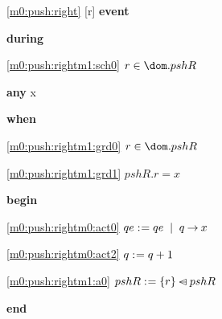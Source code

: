 \noindent \ref{m0:push:right} [r] \textbf{event}
\begin{block}
  \item   \textbf{during}
  \begin{block}
  \item[ \eqref{m0:push:rightm1:sch0} ]$r \in \dom.pshR $ %
  \end{block}
  \item   \textbf{any} x
  \item   \textbf{when}
  \begin{block}
  \item[ \eqref{m0:push:rightm1:grd0} ]$r \in \dom.pshR $ %
  \item[ \eqref{m0:push:rightm1:grd1} ]$pshR.r = x $ %
  \end{block}
  \item   \textbf{begin}
  \begin{block}
  \item[ \eqref{m0:push:rightm0:act0} ]$qe \mathrel{:\mkern1mu=} qe \; \; | \; \; q \mathbin\rightarrow x $ %
  \item[ \eqref{m0:push:rightm0:act2} ]$q \mathrel{:\mkern1mu=} q+1 $ %
  \item[ \eqref{m0:push:rightm1:a0} ]$pshR \mathrel{:\mkern1mu=} \{ r \} \mathbin{\lhd\mkern-14mu-} pshR $ %
  \end{block}
  \item   \textbf{end} \\
\end{block}
